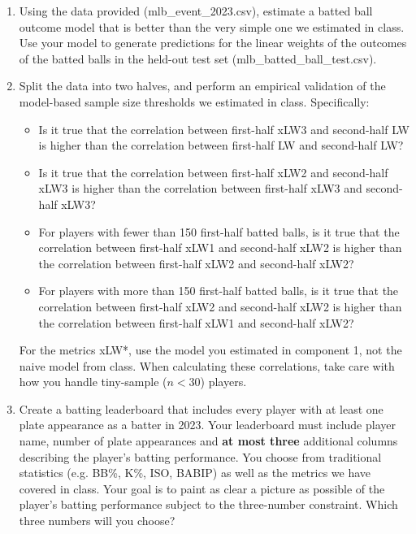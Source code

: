 \documentclass{article}
\begin{document}
      \begin{enumerate}
        \item Using the data provided (mlb\_event\_2023.csv), estimate a batted ball outcome model that is better than the very simple one we estimated in class. Use your model to generate predictions for the linear weights of the outcomes of the batted balls in the held-out test set (mlb\_batted\_ball\_test.csv).
        \item Split the data into two halves, and perform an empirical validation of the model-based sample size thresholds we estimated in class. Specifically:
        \begin{itemize}
          \item Is it true that the correlation between first-half xLW3 and second-half LW is higher than the correlation between first-half LW and second-half LW?
          \item Is it true that the correlation between first-half xLW2 and second-half xLW3 is higher than the correlation between first-half xLW3 and second-half xLW3?
          \item For players with fewer than 150 first-half batted balls, is it true that the correlation between first-half xLW1 and second-half xLW2 is higher than the correlation between first-half xLW2 and second-half xLW2?
          \item For players with more than 150 first-half batted balls, is it true that the correlation between first-half xLW2 and second-half xLW2 is higher than the correlation between first-half xLW1 and second-half xLW2?
        \end{itemize}
        For the metrics xLW*, use the model you estimated in component 1, not the naive model from class. When calculating these correlations, take care with how you handle tiny-sample ($n < 30$) players.
        \item Create a batting leaderboard that includes every player with at least one plate appearance as a batter in 2023. Your leaderboard must include player name, number of plate appearances and {\bf at most three} additional columns describing the player's batting performance. You choose from traditional statistics (e.g. BB\%, K\%, ISO, BABIP) as well as the metrics we have covered in class. Your goal is to paint as clear a picture as possible of the player's batting performance subject to the three-number constraint. Which three numbers will you choose?
      \end{enumerate}
\end{document}
